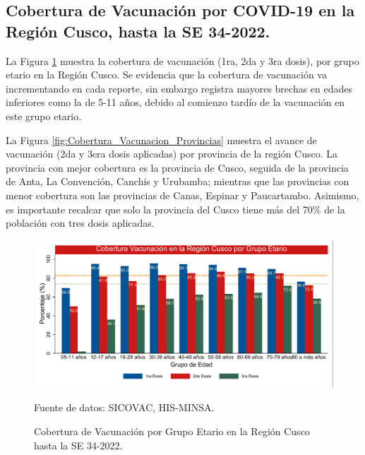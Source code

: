 \documentclass[12pt,a4paper,openany]{book}
\begin{document}
	\subsection*{Cobertura de Vacunación por COVID-19 en la Región Cusco, hasta la SE 34-2022.}
	\noindent La Figura \ref{fig:vacuna_edad} muestra la cobertura de vacunación (1ra, 2da y 3ra dosis), por grupo etario en la Región Cusco. Se evidencia que la cobertura de vacunación va incrementando en cada reporte, sin embargo registra mayores brechas en edades inferiores como la de 5-11 años, debido al comienzo tardío de la vacunación en este grupo etario.
	
	La Figura \ref{fig:Cobertura_Vacunacion_Provincias} muestra el avance de vacunación (2da y 3era dosis aplicadas) por provincia de la región Cusco. La provincia con mejor cobertura es la provincia de Cusco, seguida de la provincia de Anta, La Convención, Canchis y Urubamba; mientras que las provincias con menor cobertura son las provincias de Canas, Espinar y Paucartambo. Asimismo, es importante recalcar que solo la provincia del Cusco tiene más del 70$\%$ de la población con tres dosis aplicadas. 
	\begin{figure}[h]
		\caption{Cobertura de Vacunación por Grupo Etario en la Región Cusco hasta la SE 34-2022. }\label{fig:vacuna_edad}
		\begin{center}
			\includegraphics[width=0.85\linewidth]{../figuras/vacunacion_grupo_edad_dosis.pdf}
		\end{center}
		{\footnotesize {Fuente de datos: SICOVAC, HIS-MINSA.}}
	\end{figure}
	\clearpage
	
\end{document}
